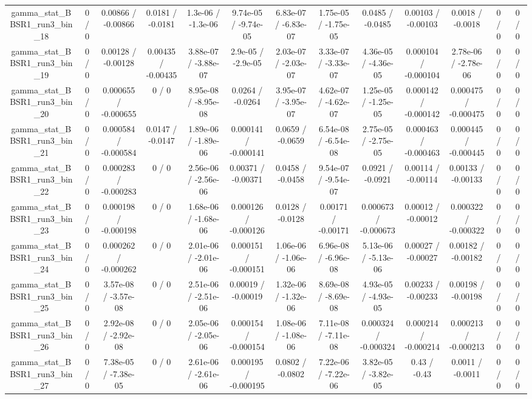 \documentclass[10pt]{article}
\begin{document}
\begin{table}[htbp]
\begin{center}
\begin{tabular}{|c|c|c|c|c|c|c|c|c|c|c|c|c|}
  gamma_stat_BBSR1_run3_bin_18 & 0 / 0 & 0.00866 / -0.00866 & 0.0181 / -0.0181 & 1.3e-06 / -1.3e-06 & 9.74e-05 / -9.74e-05 & 6.83e-07 / -6.83e-07 & 1.75e-05 / -1.75e-05 & 0.0485 / -0.0485 & 0.00103 / -0.00103 & 0.0018 / -0.0018 & 0 / 0 & 0 / 0 \\ 
  gamma_stat_BBSR1_run3_bin_19 & 0 / 0 & 0.00128 / -0.00128 & 0.00435 / -0.00435 & 3.88e-07 / -3.88e-07 & 2.9e-05 / -2.9e-05 & 2.03e-07 / -2.03e-07 & 3.33e-07 / -3.33e-07 & 4.36e-05 / -4.36e-05 & 0.000104 / -0.000104 & 2.78e-06 / -2.78e-06 & 0 / 0 & 0 / 0 \\ 
  gamma_stat_BBSR1_run3_bin_20 & 0 / 0 & 0.000655 / -0.000655 & 0 / 0 & 8.95e-08 / -8.95e-08 & 0.0264 / -0.0264 & 3.95e-07 / -3.95e-07 & 4.62e-07 / -4.62e-07 & 1.25e-05 / -1.25e-05 & 0.000142 / -0.000142 & 0.000475 / -0.000475 & 0 / 0 & 0 / 0 \\ 
  gamma_stat_BBSR1_run3_bin_21 & 0 / 0 & 0.000584 / -0.000584 & 0.0147 / -0.0147 & 1.89e-06 / -1.89e-06 & 0.000141 / -0.000141 & 0.0659 / -0.0659 & 6.54e-08 / -6.54e-08 & 2.75e-05 / -2.75e-05 & 0.000463 / -0.000463 & 0.000445 / -0.000445 & 0 / 0 & 0 / 0 \\ 
  gamma_stat_BBSR1_run3_bin_22 & 0 / 0 & 0.000283 / -0.000283 & 0 / 0 & 2.56e-06 / -2.56e-06 & 0.00371 / -0.00371 & 0.0458 / -0.0458 & 9.54e-07 / -9.54e-07 & 0.0921 / -0.0921 & 0.00114 / -0.00114 & 0.00133 / -0.00133 & 0 / 0 & 0 / 0 \\ 
  gamma_stat_BBSR1_run3_bin_23 & 0 / 0 & 0.000198 / -0.000198 & 0 / 0 & 1.68e-06 / -1.68e-06 & 0.000126 / -0.000126 & 0.0128 / -0.0128 & 0.00171 / -0.00171 & 0.000673 / -0.000673 & 0.00012 / -0.00012 & 0.000322 / -0.000322 & 0 / 0 & 0 / 0 \\ 
  gamma_stat_BBSR1_run3_bin_24 & 0 / 0 & 0.000262 / -0.000262 & 0 / 0 & 2.01e-06 / -2.01e-06 & 0.000151 / -0.000151 & 1.06e-06 / -1.06e-06 & 6.96e-08 / -6.96e-08 & 5.13e-06 / -5.13e-06 & 0.00027 / -0.00027 & 0.00182 / -0.00182 & 0 / 0 & 0 / 0 \\ 
  gamma_stat_BBSR1_run3_bin_25 & 0 / 0 & 3.57e-08 / -3.57e-08 & 0 / 0 & 2.51e-06 / -2.51e-06 & 0.00019 / -0.00019 & 1.32e-06 / -1.32e-06 & 8.69e-08 / -8.69e-08 & 4.93e-05 / -4.93e-05 & 0.00233 / -0.00233 & 0.00198 / -0.00198 & 0 / 0 & 0 / 0 \\ 
  gamma_stat_BBSR1_run3_bin_26 & 0 / 0 & 2.92e-08 / -2.92e-08 & 0 / 0 & 2.05e-06 / -2.05e-06 & 0.000154 / -0.000154 & 1.08e-06 / -1.08e-06 & 7.11e-08 / -7.11e-08 & 0.000324 / -0.000324 & 0.000214 / -0.000214 & 0.000213 / -0.000213 & 0 / 0 & 0 / 0 \\ 
  gamma_stat_BBSR1_run3_bin_27 & 0 / 0 & 7.38e-05 / -7.38e-05 & 0 / 0 & 2.61e-06 / -2.61e-06 & 0.000195 / -0.000195 & 0.0802 / -0.0802 & 7.22e-06 / -7.22e-06 & 3.82e-05 / -3.82e-05 & 0.43 / -0.43 & 0.0011 / -0.0011 & 0 / 0 & 0 / 0 \\ 

\end{tabular}
\end{center}
\end{table}
\end{document}
